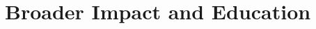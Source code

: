 \documentclass{article}
\theoremstyle{remark}
\begin{document}

\section{Broader Impact and Education} 
\end{document}
